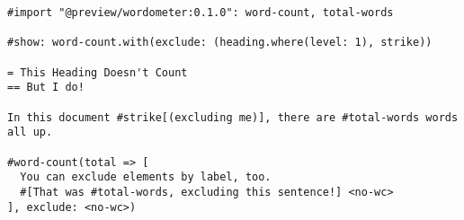 \begin{verbatim}
#import "@preview/wordometer:0.1.0": word-count, total-words

#show: word-count.with(exclude: (heading.where(level: 1), strike))

= This Heading Doesn't Count
== But I do!

In this document #strike[(excluding me)], there are #total-words words all up.

#word-count(total => [
  You can exclude elements by label, too.
  #[That was #total-words, excluding this sentence!] <no-wc>
], exclude: <no-wc>)
\end{verbatim}

\pandocbounded{}


